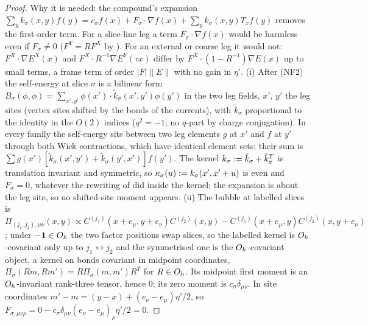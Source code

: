 \begin{proof}
Why it is needed: the compound's expansion $\sum_yk_\sigma(x,y)f(y)=c_\sigma f(x)+F_\sigma\cdot\nabla f(x)+\sum_yk_\sigma(x,y)T_xf(y)$ removes the first-order term. For a slice-line leg a term $F_\sigma\cdot\nabla f(x)$ would be harmless even if $F_\sigma\ne0$ ($F^Y=RF^X$ by ). For an external or coarse leg it would not: $F^X\cdot\nabla E^X(x)$ and $F^X\cdot R^{-1}\nabla E^Y(\tau x)$ differ by $F^X\cdot(1-R^{-1})\nabla E(x)$ up to small terms, a frame term of order $|F|\|E\|$ with no gain in $\eta'$. (i) After (NF2) the self-energy at slice $\sigma$ is a bilinear form $B_\sigma(\phi,\phi)=\sum_{x',y'}\phi(x')\cdot\tilde k_\sigma(x',y')\phi(y')$ in the two leg fields, $x'$, $y'$ the leg sites (vertex sites shifted by the bonds of the currents), with $\tilde k_\sigma$ proportional to the identity in the $O(2)$ indices ($q^2=-1$; no $q$-part by charge conjugation). In every family the self-energy sits between two leg elements $g$ at $x'$ and $f$ at $y'$ through both Wick contractions, which have identical element sets; their sum is $\sum g(x')[\tilde k_\sigma(x',y')+\tilde k_\sigma(y',x')]f(y')$. The kernel $k_\sigma:=\tilde k_\sigma+\tilde k_\sigma^T$ is translation invariant and symmetric, so $\kappa_\sigma(u):= k_\sigma(x',x'+u)$ is even and $F_\sigma=0$, whatever the rewriting of  did inside the kernel; the expansion is about the leg site, so no shifted-site moment appears. (ii) The bubble at labelled slices is $\Pi_{(j_1,j_2),\mu\nu}(x,y)\propto C^{(j_1)}(x+e_\mu,y+e_\nu)C^{(j_2)}(x,y)-C^{(j_1)}(x+e_\mu,y)C^{(j_2)}(x,y+e_\nu)$; under $-\mathbf 1\in O_h$ the two factor positions swap slices, so the labelled kernel is $O_h$-covariant only up to $j_1\leftrightarrow j_2$ and the symmetrised one is the $O_h$-covariant object, a kernel on bonds covariant in midpoint coordinates, $\Pi_\sigma(Rm,Rm')=R\Pi_\sigma(m,m')R^T$ for $R\in O_h$. Its midpoint first moment is an $O_h$-invariant rank-three tensor, hence $0$; its zero moment is $c_\sigma\delta_{\mu\nu}$. In site coordinates $m'-m=(y-x)+(e_\nu-e_\mu)\eta'/2$, so $F_{\sigma,\mu\nu\rho}=0-c_\sigma\delta_{\mu\nu}(e_\nu-e_\mu)_\rho\eta'/2=0$.
\end{proof}

